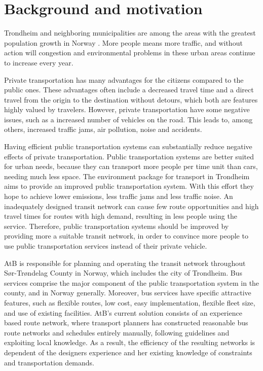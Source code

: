 \section{Background and motivation}
\label{sec:backgroundAndMotivation}

Trondheim and neighboring municipalities are among the areas with the greatest population growth in Norway \citep{website:miljopakken}. More people means more traffic, and without action will congestion and environmental problems in these urban areas continue to increase every year.

Private transportation has many advantages for the citizens compared to the public ones. These advantages often include a decreased travel time and a direct travel from the origin to the destination without detours, which both are features highly valued by travelers. However, private transportation have some negative issues, such as a increased number of vehicles on the road. This leads to, among others, increased traffic jams, air pollution, noise and accidents. 

Having efficient public transportation systems can substantially reduce negative effects of private transportation. Public transportation systems are better suited for urban needs, because they can transport more people per time unit than cars, needing much less space. The environment package for transport in Trondheim aims to provide an improved public transportation system\citep{website:miljopakken}. With this effort they hope to achieve lower emissions, less traffic jams and less traffic noise. An inadequately designed transit network can cause few route opportunities and high travel times for routes with high demand, resulting in less people using the service. Therefore, public transportation systems should be improved by providing more a suitable transit network, in order to convince more people to use public transportation services instead of their private vehicle.

AtB\citep{website:atb} is responsible for planning and operating the transit network throughout Sør-Trøndelag County in Norway, which includes the city of Trondheim. Bus services comprise the major component of the public transportation system in the county, and in Norway generally. Moreover, bus services have specific attractive features, such as flexible routes, low cost, easy implementation, flexible fleet size, and use of existing facilities. AtB's current solution consists of an experience based route network, where transport planners has constructed reasonable bus route networks and schedules entirely manually, following guidelines and exploiting local knowledge. As a result, the efficiency of the resulting networks is dependent of the designers experience and her existing knowledge of constraints and transportation demands.

